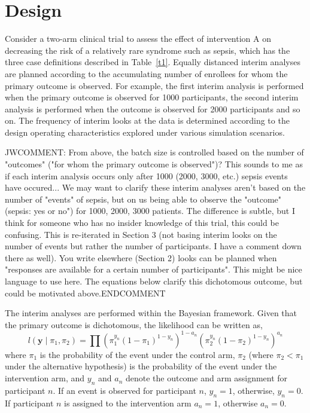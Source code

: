 \documentclass[12pt]{article}
\begin{document}
\section{Design}\label{Sec:design}

Consider a two-arm clinical trial to assess the effect of intervention A on decreasing the risk of a relatively rare syndrome such as sepsis, which has the three case definitions described in Table~\ref{t1}. Equally distanced interim analyses are planned according to the accumulating number of enrollees for whom the primary outcome is observed. For example, the first interim analysis is performed when the primary outcome is observed for 1000 participants, the second interim analysis is performed when the outcome is observed for 2000 participants and so on. The frequency of interim looks at the data is determined according to the design operating characteristics explored under various simulation scenarios.

JWCOMMENT:  From above, the batch size is controlled based on the number of "outcomes" ("for whom the primary outcome is observed")?  This sounds to me as if each interim analysis occurs only after 1000 (2000, 3000, etc.) sepsis events have occured...  We may want to clarify these interim analyses aren't based on the number of "events" of sepsis, but on us being able to observe the "outcome" (sepsis: yes or no") for 1000, 2000, 3000 patients.  The difference is subtle, but I think for someone who has no insider knowledge of this trial, this could be confusing.  This is re-iterated in Section 3 (not basing interim looks on the number of events but rather the number of participants. I have a comment down there as well). You write elsewhere (Section 2) looks can be planned when "responses are available for a certain number of participants".  This might be nice language to use here. The equations below clarify this dichotomous outcome, but could be motivated above.ENDCOMMENT

The interim analyses are performed within the Bayesian framework. Given that the primary outcome is dichotomous, the likelihood can be written as,
\begin{equation}
l(\mathbf{y}\mid \pi_1, \pi_2) = \prod \left(\pi_1^{y_n}(1-\pi_1)^{1-y_n}\right)^{1-a_n}\left(\pi_2^{y_n}(1-\pi_2)^{1-y_n}\right)^{a_n}
\end{equation}
where  $\pi_1$ is the probability of the event under the control arm, $\pi_2$ (where $\pi_2<\pi_1$ under the alternative hypothesis) is the probability of the event under the intervention arm, and $y_n$ and $a_n$ denote the outcome and arm assignment for participant $n$. If an event is observed for participant $n$, $y_n = 1$, otherwise, $y_n = 0$. If participant $n$ is assigned to the intervention arm $a_n=1$, otherwise $a_n=0$.
\end{document}
